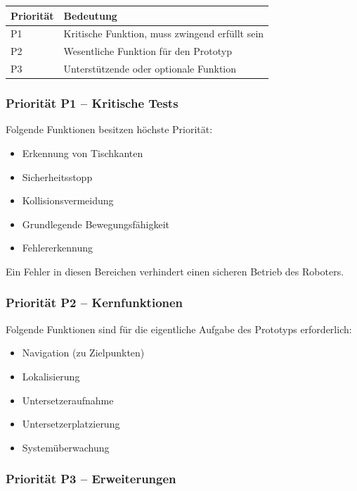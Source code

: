 \begin{longtable}[]{@{}ll@{}}
\toprule\noalign{}
Priorität & Bedeutung \\
\midrule\noalign{}
\endhead
\bottomrule\noalign{}
\endlastfoot
P1 & Kritische Funktion, muss zwingend erfüllt sein \\
P2 & Wesentliche Funktion für den Prototyp \\
P3 & Unterstützende oder optionale Funktion \\
\end{longtable}

\subsubsection{Priorität P1 -- Kritische
Tests}\label{priorituxe4t-p1-kritische-tests}

Folgende Funktionen besitzen höchste Priorität:

\begin{itemize}
\tightlist
\item
  Erkennung von Tischkanten
\item
  Sicherheitsstopp
\item
  Kollisionsvermeidung
\item
  Grundlegende Bewegungsfähigkeit
\item
  Fehlererkennung
\end{itemize}

Ein Fehler in diesen Bereichen verhindert einen sicheren Betrieb des
Roboters.

\subsubsection{Priorität P2 --
Kernfunktionen}\label{priorituxe4t-p2-kernfunktionen}

Folgende Funktionen sind für die eigentliche Aufgabe des Prototyps
erforderlich:

\begin{itemize}
\tightlist
\item
  Navigation (zu Zielpunkten)
\item
  Lokalisierung
\item
  Untersetzeraufnahme
\item
  Untersetzerplatzierung
\item
  Systemüberwachung
\end{itemize}

\subsubsection{Priorität P3 --
Erweiterungen}\label{priorituxe4t-p3-erweiterungen}

